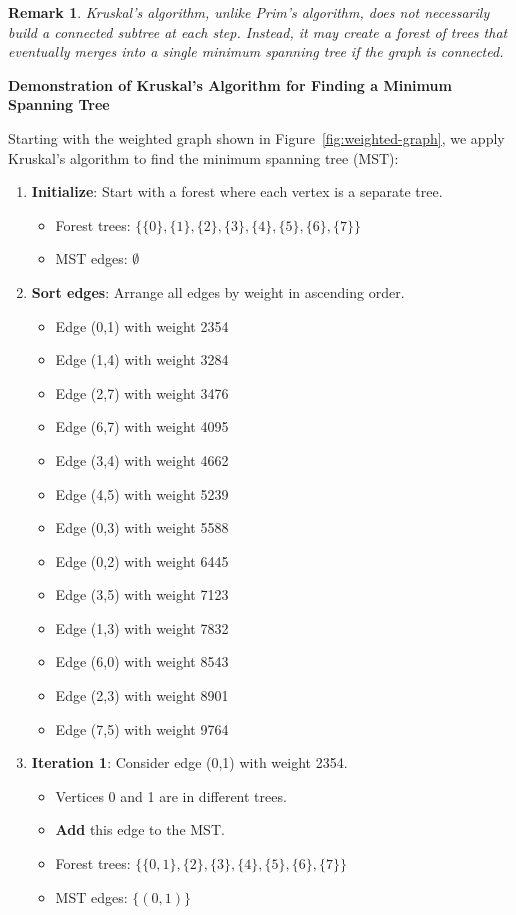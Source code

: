 \documentclass{article}
\newtheorem{remark}{Remark}
\theoremstyle{definition}
\begin{document}
\begin{remark}
Kruskal's algorithm, unlike Prim's algorithm, does not necessarily build a connected subtree at each step. Instead, it may create a forest of trees that eventually merges into a single minimum spanning tree if the graph is connected.
\end{remark}


\noindent\textbf{Demonstration of Kruskal's Algorithm for Finding a Minimum Spanning Tree}

Starting with the weighted graph shown in Figure~\ref{fig:weighted-graph}, we apply Kruskal's algorithm to find the minimum spanning tree (MST):

\begin{enumerate}
\item \textbf{Initialize}: Start with a forest where each vertex is a separate tree.
   \begin{itemize}
   \item Forest trees: $\{\{0\}, \{1\}, \{2\}, \{3\}, \{4\}, \{5\}, \{6\}, \{7\}\}$
   \item MST edges: $\emptyset$
   \end{itemize}

\item \textbf{Sort edges}: Arrange all edges by weight in ascending order.
   \begin{itemize}
   \item Edge (0,1) with weight 2354
   \item Edge (1,4) with weight 3284
   \item Edge (2,7) with weight 3476
   \item Edge (6,7) with weight 4095
   \item Edge (3,4) with weight 4662
   \item Edge (4,5) with weight 5239
   \item Edge (0,3) with weight 5588
   \item Edge (0,2) with weight 6445
   \item Edge (3,5) with weight 7123
   \item Edge (1,3) with weight 7832
   \item Edge (6,0) with weight 8543
   \item Edge (2,3) with weight 8901
   \item Edge (7,5) with weight 9764
   \end{itemize}

\item \textbf{Iteration 1}: Consider edge (0,1) with weight 2354.
   \begin{itemize}
   \item Vertices 0 and 1 are in different trees.
   \item \textbf{Add} this edge to the MST.
   \item Forest trees: $\{\{0,1\}, \{2\}, \{3\}, \{4\}, \{5\}, \{6\}, \{7\}\}$
   \item MST edges: $\{(0,1)\}$
   \end{itemize}


\end{enumerate}
\end{document}
